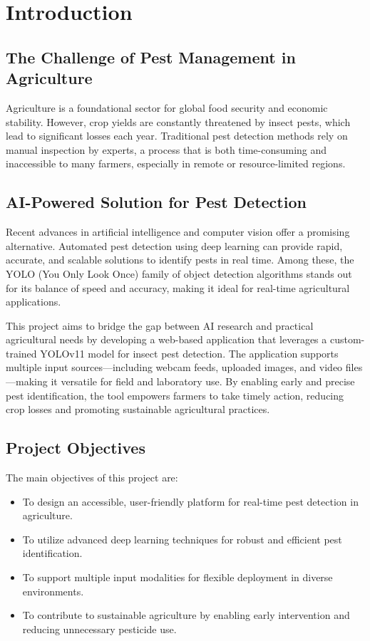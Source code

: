 \section{Introduction}
\label{sec:introduction}

\subsection{The Challenge of Pest Management in Agriculture}
Agriculture is a foundational sector for global food security and economic stability. However, crop yields are constantly threatened by insect pests, which lead to significant losses each year. Traditional pest detection methods rely on manual inspection by experts, a process that is both time-consuming and inaccessible to many farmers, especially in remote or resource-limited regions.

\subsection{AI-Powered Solution for Pest Detection}
Recent advances in artificial intelligence and computer vision offer a promising alternative. Automated pest detection using deep learning can provide rapid, accurate, and scalable solutions to identify pests in real time. Among these, the YOLO (You Only Look Once) family of object detection algorithms stands out for its balance of speed and accuracy, making it ideal for real-time agricultural applications.

This project aims to bridge the gap between AI research and practical agricultural needs by developing a web-based application that leverages a custom-trained YOLOv11 model for insect pest detection. The application supports multiple input sources—including webcam feeds, uploaded images, and video files—making it versatile for field and laboratory use. By enabling early and precise pest identification, the tool empowers farmers to take timely action, reducing crop losses and promoting sustainable agricultural practices.

\subsection{Project Objectives}
The main objectives of this project are:
\begin{itemize}
    \item To design an accessible, user-friendly platform for real-time pest detection in agriculture.
    \item To utilize advanced deep learning techniques for robust and efficient pest identification.
    \item To support multiple input modalities for flexible deployment in diverse environments.
    \item To contribute to sustainable agriculture by enabling early intervention and reducing unnecessary pesticide use.
\end{itemize}